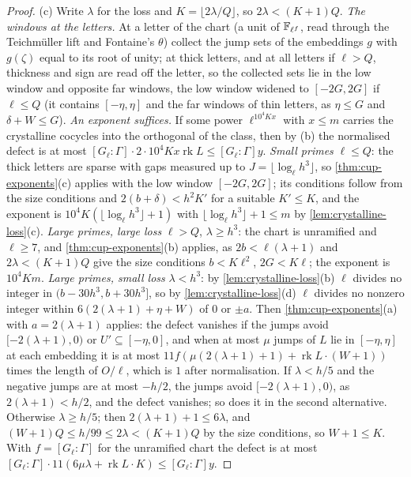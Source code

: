 \begin{proof}
(c) Write $\lambda$ for the loss and $K=\lfloor2\lambda/Q\rfloor$, so $2\lambda<(K+1)Q$. \emph{The windows at the letters.} At a letter of the chart (a unit of $\mathbb{F}_{\ell^f}$, read through the Teichm\"uller lift and Fontaine's $\theta$) collect the jump sets of the
embeddings $g$ with $g(\zeta)$ equal to its root of unity; at thick letters, and at all letters if $\ell>Q$, thickness and sign are read off the letter, so the collected sets lie in the low window and opposite far windows, the low window
widened to $[-2G,2G]$ if $\ell\le Q$ (it contains $[-\eta,\eta]$ and the far windows of thin letters, as $\eta\le G$ and $\delta+W\le G$). \emph{An exponent suffices.} If some power $\ell^{10^4Kx}$ with $x\le m$ carries the crystalline cocycles into the
orthogonal of the class, then by (b) the normalised defect is at most $[G_\ell:\Gamma]\cdot2\cdot10^4Kx\operatorname{rk}L\le[G_\ell:\Gamma]y$. \emph{Small primes} $\ell\le Q$: the thick letters are sparse with gaps measured up to $J=\lfloor\log_\ell h^3\rfloor$, so
\cref{thm:cup-exponents}(c) applies with the low window $[-2G,2G]$; its conditions follow from the size conditions and $2(b+\delta)<h^2K'$ for a suitable $K'\le K$, and the exponent is $10^4K(\lfloor\log_\ell h^3\rfloor+1)$ with
$\lfloor\log_\ell h^3\rfloor+1\le m$ by \cref{lem:crystalline-loss}(c). \emph{Large primes, large loss} $\ell>Q$, $\lambda\ge h^3$: the chart is unramified and $\ell\ge7$, and \cref{thm:cup-exponents}(b) applies, as $2b<\ell(\lambda+1)$ and $2\lambda<(K+1)Q$ give the
size conditions $b<K\ell^2$, $2G<K\ell$; the exponent is $10^4Km$. \emph{Large primes, small loss} $\lambda<h^3$: by \cref{lem:crystalline-loss}(b) $\ell$ divides no integer in $(b-30h^3,b+30h^3]$, so by \cref{lem:crystalline-loss}(d) $\ell$ divides no nonzero
integer within $6(2(\lambda+1)+\eta+W)$ of $0$ or $\pm a$. Then \cref{thm:cup-exponents}(a) with $a=2(\lambda+1)$ applies: the defect vanishes if the jumps avoid $[-2(\lambda+1),0)$ or $U'\subseteq[-\eta,0]$, and when at most $\mu$ jumps of $L$
lie in $[-\eta,\eta]$ at each embedding it is at most $11f(\mu(2(\lambda+1)+1)+\operatorname{rk}L\cdot(W+1))$ times the length of $O/\ell$, which is $1$ after normalisation. If $\lambda<h/5$ and the negative jumps are at most $-h/2$, the jumps avoid
$[-2(\lambda+1),0)$, as $2(\lambda+1)<h/2$, and the defect vanishes; so does it in the second alternative. Otherwise $\lambda\ge h/5$; then $2(\lambda+1)+1\le6\lambda$, and $(W+1)Q\le h/99\le2\lambda<(K+1)Q$ by the size conditions, so $W+1\le K$. With
$f=[G_\ell:\Gamma]$ for the unramified chart the defect is at most $[G_\ell:\Gamma]\cdot11(6\mu\lambda+\operatorname{rk}L\cdot K)\le[G_\ell:\Gamma]y$.
\end{proof}

